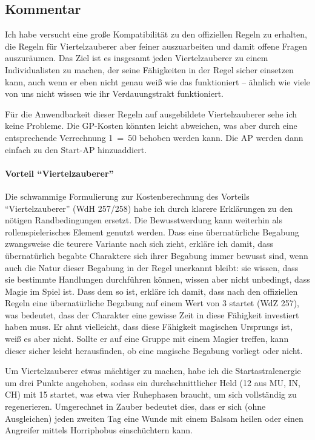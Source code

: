 \subsection{Kommentar}
Ich habe versucht eine große Kompatibilität zu den offiziellen Regeln zu erhalten, die Regeln für Viertelzauberer aber feiner auszuarbeiten und damit offene Fragen auszuräumen. Das Ziel ist es insgesamt jeden Viertelzauberer zu einem Individualisten zu machen, der seine Fähigkeiten in der Regel sicher einsetzen kann, auch wenn er eben nicht genau weiß wie das funktioniert -- ähnlich wie viele von uns nicht wissen wie ihr Verdauungstrakt funktioniert.

Für die Anwendbarkeit dieser Regeln auf ausgebildete Viertelzauberer sehe ich keine Probleme. Die GP-Kosten könnten leicht abweichen, was aber durch eine entsprechende Verrechnung \SI{1}{\GP}~=~\SI{50}{\AP} behoben werden kann. Die AP werden dann einfach zu den Start-AP hinzuaddiert.

\paragraph{Vorteil \enquote{Viertelzauberer}}
Die schwammige Formulierung zur Kostenberechnung des Vorteils \enquote{Viertelzauberer} (WdH 257/258) habe ich durch klarere Erklärungen zu den nötigen Randbedingungen ersetzt. Die Bewusstwerdung kann weiterhin als rollenspielerisches Element genutzt werden. Dass eine übernatürliche Begabung zwangsweise die teurere Variante nach sich zieht, erkläre ich damit, dass übernatürlich begabte Charaktere sich ihrer Begabung immer bewusst sind, wenn auch die Natur dieser Begabung in der Regel unerkannt bleibt: sie wissen, dass sie bestimmte Handlungen durchführen können, wissen aber nicht unbedingt, dass Magie im Spiel ist. Dass dem so ist, erkläre ich damit, dass nach den offiziellen Regeln eine übernatürliche Begabung auf einem Wert von 3 startet (WdZ 257), was bedeutet, dass der Charakter eine gewisse Zeit in diese Fähigkeit investiert haben muss. Er ahnt vielleicht, dass diese Fähigkeit magischen Ursprungs ist, weiß es aber nicht. Sollte er auf eine Gruppe mit einem Magier treffen, kann dieser sicher leicht herausfinden, ob eine magische Begabung vorliegt oder nicht.

Um Viertelzauberer etwas mächtiger zu machen, habe ich die Startastralenergie um drei Punkte angehoben, sodass ein durchschnittlicher Held (12 aus MU, IN, CH) mit \SI{15}{\AsP} startet, was etwa vier Ruhephasen braucht, um sich vollständig zu regenerieren. Umgerechnet in Zauber bedeutet dies, dass er sich (ohne Ausgleichen) jeden zweiten Tag eine Wunde mit einem Balsam heilen oder einen Angreifer mittels Horriphobus einschüchtern kann.


